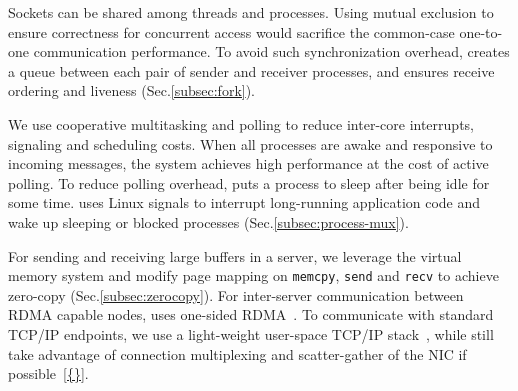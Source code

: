 Sockets can be shared among threads and processes. Using mutual exclusion to ensure correctness for concurrent access would sacrifice the common-case one-to-one communication performance. To avoid such synchronization overhead, \sys creates a queue between each pair of sender and receiver processes, and ensures receive ordering and liveness (Sec.\ref{subsec:fork}).

We use cooperative multitasking and polling to reduce inter-core interrupts, signaling and scheduling costs. When all processes are awake and responsive to incoming messages, the system achieves high performance at the cost of active polling. To reduce polling overhead, \sys puts a process to sleep after being idle for some time. \sys uses Linux signals to interrupt long-running application code and wake up sleeping or blocked processes (Sec.\ref{subsec:process-mux}). 

For sending and receiving large buffers in a server, we leverage the virtual memory system and modify page mapping on \texttt{memcpy}, \texttt{send} and \texttt{recv} to achieve zero-copy (Sec.\ref{subsec:zerocopy}). For inter-server communication between RDMA capable nodes, \sys uses one-sided RDMA~\cite{mitchell2013using,kaminsky2016design}. To communicate with standard TCP/IP endpoints, we use a light-weight user-space TCP/IP stack~\cite{dunkels2001design}, while still take advantage of connection multiplexing and scatter-gather of the NIC if possible~\ref{{}}. %





